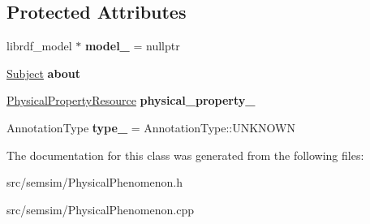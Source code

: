 \subsection*{Protected Attributes}
\begin{DoxyCompactItemize}
\item 
\mbox{\label{classsemsim_1_1PhysicalPhenomenon_a8a9e00b125ff439cd257f5c58dff68db}} 
librdf\+\_\+model $\ast$ {\bfseries model\+\_\+} = nullptr
\item 
\mbox{\label{classsemsim_1_1PhysicalPhenomenon_aa43a5f6719a6d44d4b96081b2f2622fe}} 
\hyperlink{classsemsim_1_1Subject}{Subject} {\bfseries about}
\item 
\mbox{\label{classsemsim_1_1PhysicalPhenomenon_a264d752c356d2c6011da6d3cd1494418}} 
\hyperlink{classsemsim_1_1PhysicalPropertyResource}{Physical\+Property\+Resource} {\bfseries physical\+\_\+property\+\_\+}
\item 
\mbox{\label{classsemsim_1_1PhysicalPhenomenon_ad18e38168bcec1925e6bd9ed08494614}} 
Annotation\+Type {\bfseries type\+\_\+} = Annotation\+Type\+::\+U\+N\+K\+N\+O\+WN
\end{DoxyCompactItemize}


The documentation for this class was generated from the following files\+:\begin{DoxyCompactItemize}
\item 
src/semsim/Physical\+Phenomenon.\+h\item 
src/semsim/Physical\+Phenomenon.\+cpp\end{DoxyCompactItemize}
